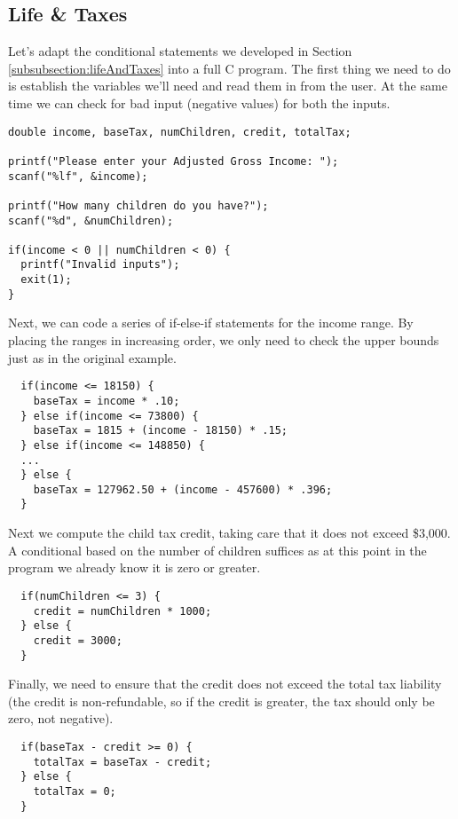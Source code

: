 \subsection{Life \& Taxes}

Let's adapt the conditional statements we developed in Section \ref{subsubsection:lifeAndTaxes}
into a full C program.  The first thing we need to do is establish the variables we'll need and
read them in from the user.  At the same time we can check for bad input (negative values)
for both the inputs.

\begin{verbatim}
double income, baseTax, numChildren, credit, totalTax;

printf("Please enter your Adjusted Gross Income: ");
scanf("%lf", &income);

printf("How many children do you have?");
scanf("%d", &numChildren);

if(income < 0 || numChildren < 0) {
  printf("Invalid inputs");   
  exit(1);
}
\end{verbatim}

Next, we can code a series of if-else-if statements for the income range.  By
placing the ranges in increasing order, we only need to check the upper bounds
just as in the original example.

\begin{verbatim}
  if(income <= 18150) {
    baseTax = income * .10;
  } else if(income <= 73800) {
    baseTax = 1815 + (income - 18150) * .15;
  } else if(income <= 148850) {
  ...  
  } else {
    baseTax = 127962.50 + (income - 457600) * .396;
  }
\end{verbatim}

Next we compute the child tax credit, taking care that it does
not exceed \$3,000.  A conditional based on the number of children
suffices as at this point in the program we already know it is
zero or greater.

\begin{verbatim}
  if(numChildren <= 3) {
    credit = numChildren * 1000;
  } else {
    credit = 3000;
  }
\end{verbatim}

Finally, we need to ensure that the credit does not exceed the total tax
liability (the credit is non-refundable, so if the credit is greater, the tax
should only be zero, not negative).  

\begin{verbatim}
  if(baseTax - credit >= 0) {
    totalTax = baseTax - credit;
  } else {
    totalTax = 0;
  }
\end{verbatim}

